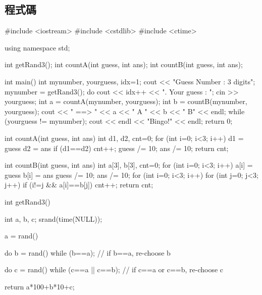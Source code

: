\subsection{程式碼}
\begin{cppcode}
#include <iostream>
#include <cstdlib>
#include <ctime>

using namespace std;

int getRand3();
int countA(int guess, int ans);
int countB(int guess, int ans);

int main()
{
	int mynumber, yourguess, idx=1;
	cout << "Guess Number : 3 digits\n\n";
	mynumber = getRand3();
	do {
		cout << idx++ << ". Your guess : ";
		cin >> yourguess;
		int a = countA(mynumber, yourguess);
		int b = countB(mynumber, yourguess);
		cout << "   ==> " << a << " A " << b << " B" << endl;
	} while (yourguess != mynumber);
	cout << endl << "Bingo!" << endl;
	return 0;
}

int countA(int guess, int ans)
{
	int d1, d2, cnt=0;
	for (int i=0; i<3; i++) {
		d1 = guess %
		d2 = ans %
		if (d1==d2) cnt++;
		guess /= 10;
		ans /= 10;
	}
	return cnt;
}

int countB(int guess, int ans)
{
	int a[3], b[3], cnt=0;
	for (int i=0; i<3; i++) {
		a[i] = guess %
		b[i] = ans %
		guess /= 10;
		ans /= 10;
	}
	for (int i=0; i<3; i++) {
		for (int j=0; j<3; j++) {
			if (i!=j && a[i]==b[j]) cnt++;
		}
	}
	return cnt;
}

int getRand3()
{
	int a, b, c;
	srand(time(NULL));
	
	a = rand() %
	
	do {
		b = rand() %
	} while (b==a);  // if b==a, re-choose b
	
	do {
		c = rand() %
	} while (c==a || c==b);  // if c==a or c==b, re-choose c
	
	return a*100+b*10+c;
}
\end{cppcode}